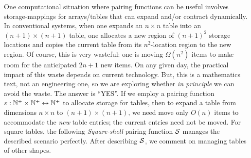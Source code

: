 One computational situation where pairing functions can be useful
involves storage-mappings for arrays/tables that can expand and/or
contract dynamically.  In conventional systems, when one expands an $n
\times n$ table into an $(n+1) \times (n+1)$ table, one allocates a
new region of $(n+1)^2$ storage locations and copies the current table
from its $n^2$-location region to the new region.  Of course, this is
very wasteful: one is moving $\Omega(n^2)$ items to make room for the
anticipated $2n+1$ new items.  On any given day, the practical impact
of this waste depends on current technology.  But, this is a
mathematics text, not an engineering one, so we are exploring whether
{\em in principle} we can avoid the waste.  The answer is ``YES''.  If
we employ a pairing function $\varepsilon: \mathbb{N}^+ \times \mathbb{N}^+
\leftrightarrow \mathbb{N}^+$ to allocate storage for tables, then to expand a
table from dimensions $n \times n$ to $(n+1) \times (n+1)$, we need
move only $O(n)$ items to accommodate the {\em new} table entries; the
current entries need not be moved.  For square tables, the following
{\it Square-shell} pairing function $\mbox{$\cal S$}$ manages the described
scenario perfectly.  After describing $\mbox{$\cal S$}$, we comment on managing
tables of other shapes.
